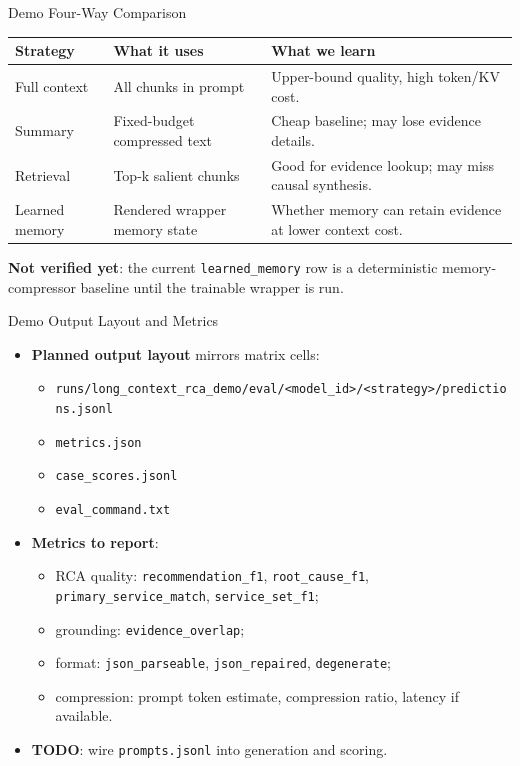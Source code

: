 \begin{frame}{Demo Four-Way Comparison}
  \begin{table}
    \small
    \begin{tabular}{p{} p{} p{}}
      \toprule
      Strategy & What it uses & What we learn \\
      \midrule
      Full context & All chunks in prompt & Upper-bound quality, high token/KV cost. \\
      Summary & Fixed-budget compressed text & Cheap baseline; may lose evidence details. \\
      Retrieval & Top-k salient chunks & Good for evidence lookup; may miss causal synthesis. \\
      Learned memory & Rendered wrapper memory state & Whether memory can retain evidence at lower context cost. \\
      \bottomrule
    \end{tabular}
  \end{table}

  \vspace{0.4em}
  \textbf{Not verified yet}: the current \texttt{learned\_memory} row is a deterministic memory-compressor baseline until the trainable wrapper is run.
\end{frame}

\begin{frame}{Demo Output Layout and Metrics}
  \begin{itemize}
    \item \textbf{Planned output layout} mirrors matrix cells:
      \begin{itemize}
        \item \texttt{runs/long\_context\_rca\_demo/eval/<model\_id>/<strategy>/predictions.jsonl}
        \item \texttt{metrics.json}
        \item \texttt{case\_scores.jsonl}
        \item \texttt{eval\_command.txt}
      \end{itemize}
    \item \textbf{Metrics to report}:
      \begin{itemize}
        \item RCA quality: \texttt{recommendation\_f1}, \texttt{root\_cause\_f1}, \texttt{primary\_service\_match}, \texttt{service\_set\_f1};
        \item grounding: \texttt{evidence\_overlap};
        \item format: \texttt{json\_parseable}, \texttt{json\_repaired}, \texttt{degenerate};
        \item compression: prompt token estimate, compression ratio, latency if available.
      \end{itemize}
    \item \textbf{TODO}: wire \texttt{prompts.jsonl} into generation and scoring.
  \end{itemize}
\end{frame}

